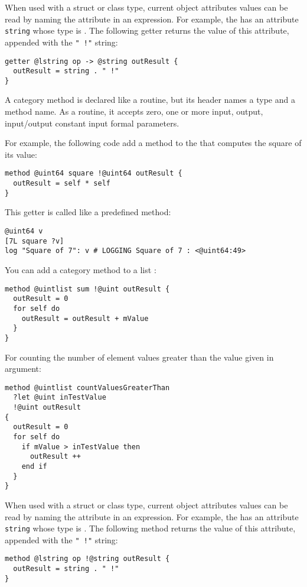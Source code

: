 When used with a struct or class type, current object attributes values can be read by naming the attribute in an expression. For example, the  has an attribute 
\lstinline[language=galgas]!string! whose type is . The following getter returns the value of this attribute, appended with the \lstinline[language=galgas]?" !"? string:
\begin{lstlisting}[language=galgas]
getter @lstring op -> @string outResult {
  outResult = string . " !"
}
\end{lstlisting}








A category method is declared like a routine, but its header names a type and a method name. As a routine, it accepts zero, one or more input, output, input/output constant input formal parameters.

For example, the following code add a method to the  that computes the square of its value:
\begin{lstlisting}[language=galgas]
method @uint64 square !@uint64 outResult {
  outResult = self * self
}
\end{lstlisting}

This getter is called like a predefined method:
\begin{lstlisting}[language=galgas]
@uint64 v
[7L square ?v]
log "Square of 7": v # LOGGING Square of 7 : <@uint64:49>
\end{lstlisting}

You can add a category method to a list :
\begin{lstlisting}[language=galgas]
method @uintlist sum !@uint outResult {
  outResult = 0
  for self do
    outResult = outResult + mValue
  }
}
\end{lstlisting}

For counting the number of element values greater than the value given in argument:
\begin{lstlisting}[language=galgas]
method @uintlist countValuesGreaterThan
  ?let @uint inTestValue
  !@uint outResult
{
  outResult = 0
  for self do
    if mValue > inTestValue then
      outResult ++
    end if
  }
}
\end{lstlisting}

When used with a struct or class type, current object attributes values can be read by naming the attribute in an expression. For example, the  has an attribute 
\lstinline[language=galgas]!string! whose type is . The following method returns the value of this attribute, appended with the \lstinline[language=galgas]?" !"? string:
\begin{lstlisting}[language=galgas]
method @lstring op !@string outResult {
  outResult = string . " !"
}
\end{lstlisting}











